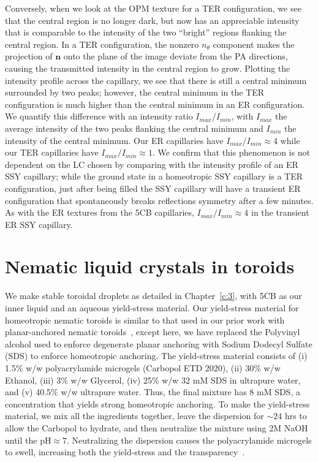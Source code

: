 Conversely, when we look at the OPM texture for a TER configuration, we see that the central region is no longer dark, but now has an appreciable intensity that is comparable to the intensity of the two ``bright'' regions flanking the central region.
In a TER configuration, the nonzero $n_{\theta}$ component makes the projection of $\mathbf{n}$ onto the plane of the image deviate from the PA directions, causing the transmitted intensity in the central region to grow.
Plotting the intensity profile across the capillary, we see that there is still a central minimum surrounded by two peaks; however, the central minimum in the TER configuration is much higher than the central minimum in an ER configuration.
We quantify this difference with an intensity ratio $I_{max}/I_{min}$, with $I_{max}$ the average intensity of the two peaks flanking the central minimum and $I_{min}$ the intensity of the central minimum. Our ER capillaries have $I_{max}/I_{min} \approx 4$ while our TER capillaries have $I_{max}/I_{min} \approx 1$.
We confirm that this phenomenon is not dependent on the LC chosen by comparing with the intensity profile of an ER SSY capillary; while the ground state in a homeotropic SSY capillary is a TER configuration, just after being filled the SSY capillary will have a transient ER configuration that spontaneously breaks reflections symmetry after a few minutes.
As with the ER textures from the 5CB capillaries, $I_{max}/I_{min} \approx 4$ in the transient ER SSY capillary.




\section{Nematic liquid crystals in toroids}
We make stable toroidal droplets as detailed in Chapter~\ref{c:3}, with 5CB as our inner liquid and an aqueous yield-stress material.
Our yield-stress material for homeotropic nematic toroids is similar to that used in our prior work with planar-anchored nematic toroids~\cite{RN46}, except here, we have replaced the Polyvinyl alcohol used to enforce degenerate planar anchoring with Sodium Dodecyl Sulfate (SDS) to enforce homeotropic anchoring.
The yield-stress material consists of (i) 1.5\% w/w polyacrylamide microgels (Carbopol ETD 2020), (ii) 30\% w/w Ethanol, (iii) 3\% w/w Glycerol, (iv) 25\% w/w 32 mM SDS in ultrapure water, and (v) 40.5\% w/w ultrapure water.
Thus, the final mixture has 8 mM SDS, a concentration that yields strong homeotropic anchoring.
To make the yield-stress material, we mix all the ingredients together, leave the dispersion for $\sim 24$ hrs to allow the Carbopol to hydrate, and then neutralize the mixture using 2M NaOH until the pH$\approx 7$.
Neutralizing the dispersion causes the polyacrylamide microgels to swell, increasing both the yield-stress and the transparency~\cite{RN46,RN47}.


